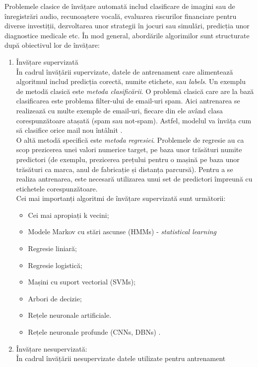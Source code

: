 \documentclass[a4paper,12pt]{report}
\begin{document}
Problemele clasice de învățare automată includ clasificare de imagini sau de înregistrări 
audio, recunoaștere vocală, evaluarea riscurilor financiare pentru 
diverse investiții, dezvoltarea unor strategii în jocuri sau simulări, predicția unor
diagnostice medicale etc. 
În mod general, abordările algorimilor sunt structurate după obiectivul 
lor de învățare: 
\begin{enumerate}
    \item Învățare supervizată \\ În cadrul învățării supervizate, datele de antrenament care alimentează algoritmul 
    includ predicția corectă, numite etichete, sau \emph{labels}. Un exemplu de metodă clasică
    este \emph{metoda clasificării}. O problemă clasică care are la bază clasificarea este 
    problema filter-ului de email-uri spam. Aici antrenarea se realizează cu multe exemple
    de email-uri, fiecare din ele având clasa corespunzătoare atașată (spam sau not-spam).
    Astfel, modelul va învăța cum să clasifice orice mail nou întâlnit \cite{Hands-On-Machine-Learning}. \\
    O altă metodă specifică este \emph{metoda regresiei}. Problemele de regresie au ca scop prezicerea unei valori numerice
    target, pe baza unor trăsături numite predictori (de exemplu, prezicerea prețului pentru o mașină
    pe baza unor trăsături ca marca, anul de fabricație și distanța parcursă). 
    Pentru a se realiza antrenarea, este necesară utilizarea unui set de predictori împreună cu etichetele 
    corespunzătoare.\\
    Cei mai importanți algoritmi de învățare supervizată sunt următorii:
        \begin{itemize} 
            \item Cei mai apropiați k vecini;
            \item Modele Markov cu stări ascunse (HMMs) - \emph{statistical learning}
            \item Regresie liniară;
            \item Regresie logistică; 
            \item Mașini cu suport vectorial (SVMs);
            \item Arbori de decizie;
            \item Rețele neuronale artificiale.
            \item Rețele neuronale profunde (CNNs, DBNs) \cite{Hands-On-Machine-Learning}.
        \end{itemize}
    \item Învățare nesupervizată: \\ În cadrul învățării nesupervizate datele utilizate pentru antrenament 

\end{enumerate}
\end{document}
